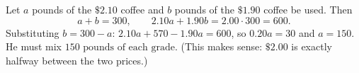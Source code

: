 Let $a$ pounds of the $\$2.10$ coffee and $b$ pounds of the $\$1.90$ coffee be used. Then
\[
a+b=300,\qquad 2.10a+1.90b=2.00\cdot300=600 .
\]
Substituting $b=300-a$: $2.10a+570-1.90a=600$, so $0.20a=30$ and $a=150$. He must mix $\boxed{150\text{ pounds of each grade}}$. (This makes sense: $\$2.00$ is exactly halfway between the two prices.)

